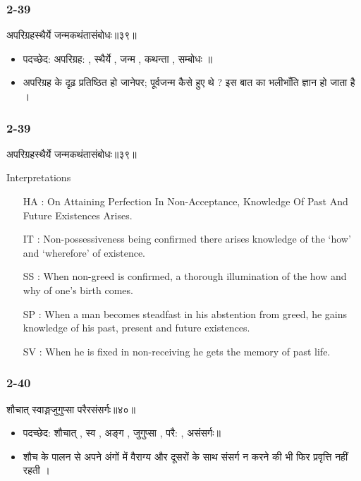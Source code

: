 \begin{frame}[fragile]\frametitle{2-39}
\begin{sanskrit}
अपरिग्रहस्थैर्ये जन्मकथंतासंबोधः॥३९॥
\end{sanskrit}

\begin{itemize}
\item पदच्छेद: अपरिग्रह: , स्थैर्ये , जन्म , कथन्ता , सम्बोधः ॥
\item अपरिग्रह के दृढ़ प्रतिष्ठित हो जानेपर; पूर्वजन्म कैसे हुए थे ? इस बात का भलीभाँति ज्ञान हो जाता है ।
\end{itemize}	
	
\end{frame}

\begin{frame}[fragile]\frametitle{2-39}
\begin{sanskrit}
अपरिग्रहस्थैर्ये जन्मकथंतासंबोधः॥३९॥
\end{sanskrit}

Interpretations
\begin{itemize}
\item [HA]: On Attaining Perfection In Non-Acceptance, Knowledge Of Past And Future Existences Arises.
\item [IT]: Non-possessiveness being confirmed there arises knowledge of the ‘how’ and ‘wherefore’ of existence.
\item [SS]: When non-greed is confirmed, a thorough illumination of the how and why of one’s birth comes.
\item [SP]: When a man becomes steadfast in his abstention from greed, he gains knowledge of his past, present and future existences.
\item [SV]: When he is fixed in non-receiving he gets the memory of past life. 
\end{itemize}
\end{frame}

\begin{frame}[fragile]\frametitle{2-40}
\begin{sanskrit}
शौचात् स्वाङ्गजुगुप्सा परैरसंसर्गः॥४०॥
\end{sanskrit}

\begin{itemize}
\item पदच्छेद: शौचात् , स्व , अङ्ग , जुगुप्सा , परै: , असंसर्गः॥
\item शौच के पालन से अपने अंगों में वैराग्य और दूसरों के साथ संसर्ग न करने की भी फिर प्रवृत्ति नहीं रहती ।
\end{itemize}	
	
\end{frame}

